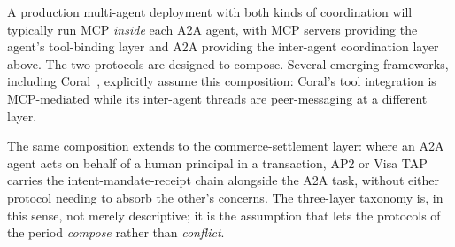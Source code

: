 A production multi-agent deployment with both kinds of
coordination will typically run MCP \emph{inside} each
A2A agent, with MCP servers providing the agent's
tool-binding layer and A2A providing the inter-agent
coordination layer above. The two protocols are designed
to compose. Several emerging frameworks, including
Coral~\cite{spec_coral}, explicitly assume this
composition: Coral's tool integration is MCP-mediated
while its inter-agent threads are peer-messaging at a
different layer.

The same composition extends to the commerce-settlement
layer: where an A2A agent acts on behalf of a human
principal in a transaction, AP2 or Visa TAP carries the
intent-mandate-receipt chain alongside the A2A task,
without either protocol needing to absorb the other's
concerns. The three-layer taxonomy is, in this sense, not
merely descriptive; it is the assumption that lets the
protocols of the period \emph{compose} rather than
\emph{conflict}.
